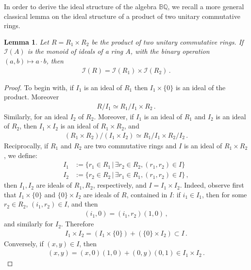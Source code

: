 \documentclass[reqno]{amsart}
\theoremstyle{plain}
\newtheorem{lemma}[theorem]{Lemma}
\theoremstyle{definition}
\theoremstyle{remark}
\numberwithin{equation}{section}
\begin{document}
\bigskip

In order to derive the ideal structure of the algebra ${{\mathbb B}{\mathbb Q}}$, we recall
a more general classical lemma on the ideal structure of a product of
two unitary commutative rings.
\begin{lemma}
  \label{product structure}
  Let $R=R_1\times R_2$ be the product of two unitary commutative
  rings. If ${{\mathcal I}}(A)$ is the monoid of ideals of a ring $A$, with the
  binary operation $(a,b)\mapsto a\cdot b$, then
  \begin{align*}
    {{\mathcal I}}(R) = {{\mathcal I}}(R_1)\times{{\mathcal I}}(R_2)\,.
  \end{align*}
\end{lemma}
\begin{proof}
  To begin with, if $I_1$ is an ideal of $R_1$ then $I_1\times\{0\}$
  is an ideal of the product. Moreover
  \begin{align*}
    R/I_1 \simeq R_1/I_1 \times R_2\,.
  \end{align*}
  Similarly, for an ideal $I_2$ of $R_2$. Moreover, if $I_1$ is an ideal
  of $R_1$ and $I_2$ is an ideal of $R_2$, then $I_1\times I_2$ is an
  ideal of $R_1\times R_2$, and
  \begin{align*}
    (R_1\times R_2)/(I_1\times I_2) \simeq R_1/I_1 \times R_2/I_2\,.
  \end{align*}
  Reciprocally, if $R_1$ and $R_2$ are two commutative rings and $I$ is
  an ideal of $R_1\times R_2$, we define:
  \begin{align*}
    I_1 &:= \{ r_1\in R_1\,\big|\, \exists r_2\in R_2, (r_1,r_2)\in I\}\\
    I_2 &:= \{ r_2\in R_2\,\big|\, \exists r_1\in R_1, (r_1,r_2)\in I\}\,,
  \end{align*}
  then $I_1, I_2$ are ideals of $R_1, R_2$, respectively, and
  $I=I_1\times I_2$. Indeed, observe first that $I_1\times \{0\}$ and
  $\{0\}\times I_2$ are ideals of $R$, contained in $I$: if
  $i_1\in I_1$, then for some $r_2\in R_2$, $(i_1,r_2)\in I$, and then
  \begin{align*}
    (i_1,0)=(i_1,r_2) (1,0)\,,
  \end{align*}
  and similarly for $I_2$. Therefore
  \begin{align*}
    I_1\times I_2 = (I_1\times \{0\}) + (\{0\}\times I_2)\subset I\,.
  \end{align*}
  Conversely, if $(x,y)\in I$, then
  \begin{align*}
    (x,y) = (x,0)(1,0) + (0,y)(0,1)\in I_1\times I_2\,.
  \end{align*}
\end{proof}
\end{document}
